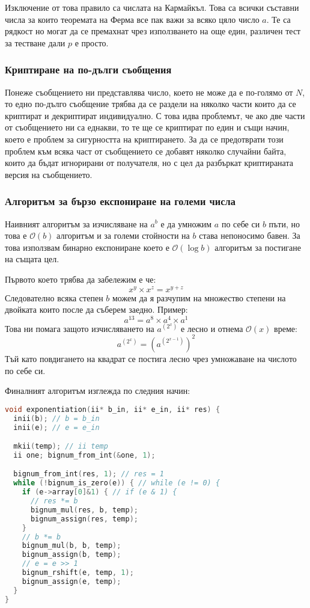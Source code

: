 Изключение от това правило са числата на Кармайкъл. Това са всички съставни числа за които теоремата на Ферма все пак важи за всяко цяло число $a$. Те са рядкост но могат да се премахнат чрез използването на още един, различен тест за тестване дали $p$ е просто.

\subsubsection{Криптиране на по-дълги съобщения}
Понеже съобщението ни представлява число, което не може да е по-голямо от $N$, то едно по-дълго съобщение трябва да се раздели на няколко части които да се криптират и декриптират индивидуално. С това идва проблемът, че ако две части от съобщението ни са еднакви, то те ще се криптират по един и същи начин, което е проблем за сигурността на криптирането. За да се предотврати този проблем към всяка част от съобщението се добавят няколко случайни байта, които да бъдат игнорирани от получателя, но с цел да разбъркат криптираната версия на съобщението.

\subsubsection{Алгоритъм за бързо експониране на големи числа}
Наивният алгоритъм за изчисляване на $a^b$ е да умножим $a$ по себе си $b$ пъти, но това е $\mathcal{O}(b)$ алгоритъм и за големи стойности на $b$ става непоносимо бавен. За това използвам бинарно експониране което е $\mathcal{O}(\log b)$ алгоритъм за постигане на същата цел.

Първото което трябва да забележим е че:
$$ x^y \times x^z = x^{y+z} $$
Следователно всяка степен $b$ можем да я разчупим на множество степени на двойката които после да съберем заедно. Пример:
$$ a^{13} = a^8 \times a^4 \times a^1 $$
Това ни помага защото изчисляването на $a^{(2^x)}$ е лесно и отнема $\mathcal{O}(x)$ време:
$$ a^{(2^x)} = (a^{(2^{x-1})})^2$$
Тъй като повдигането на квадрат се постига лесно чрез умножаване на числото по себе си.

Финалният алгоритъм изглежда по следния начин:
\begin{lstlisting}[language=C]
void exponentiation(ii* b_in, ii* e_in, ii* res) {
  inii(b); // b = b_in
  inii(e); // e = e_in

  mkii(temp); // ii temp
  ii one; bignum_from_int(&one, 1);

  bignum_from_int(res, 1); // res = 1
  while (!bignum_is_zero(e)) { // while (e != 0) {
    if (e->array[0]&1) { // if (e & 1) {
      // res *= b
      bignum_mul(res, b, temp);
      bignum_assign(res, temp);
    }
    // b *= b
    bignum_mul(b, b, temp);
    bignum_assign(b, temp);
    // e = e >> 1
    bignum_rshift(e, temp, 1);
    bignum_assign(e, temp);
  }
}
\end{lstlisting}

